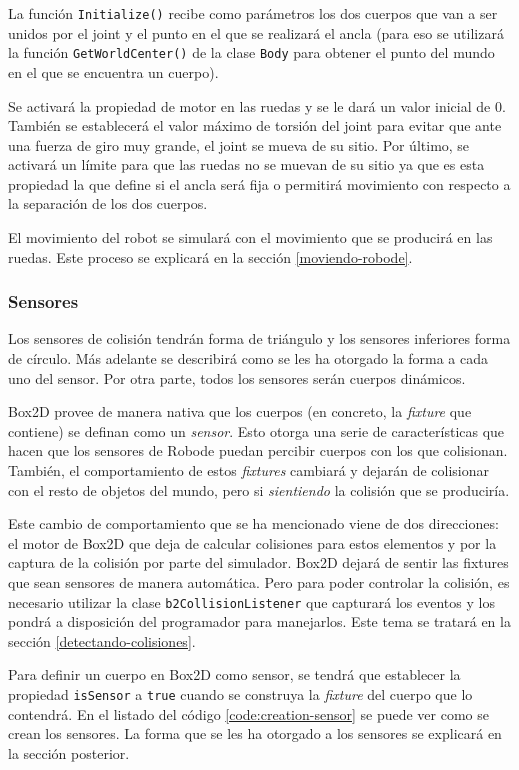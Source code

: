 La función \texttt{Initialize()} recibe como parámetros los dos cuerpos que van a ser unidos por el joint y el punto en el que se realizará el ancla (para eso se utilizará la función \texttt{GetWorldCenter()} de la clase \texttt{Body} para obtener el punto del mundo en el que se encuentra un cuerpo).

Se activará la propiedad de motor en las ruedas y se le dará un valor inicial de 0. También se establecerá el valor máximo de torsión del joint para evitar que ante una fuerza de giro muy grande, el joint se mueva de su sitio. Por último, se activará un límite para que las ruedas no se muevan de su sitio ya que es esta propiedad la que define si el ancla será fija o permitirá movimiento con respecto a la separación de los dos cuerpos.

El movimiento del robot se simulará con el movimiento que se producirá en las ruedas. Este proceso se explicará en la sección \ref{moviendo-robode}.

\subsubsection*{Sensores}

Los sensores de colisión tendrán forma de triángulo y los sensores inferiores forma de círculo. Más adelante se describirá como se les ha otorgado la forma a cada uno del sensor. Por otra parte, todos los sensores serán cuerpos dinámicos.

Box2D provee de manera nativa que los cuerpos (en concreto, la \emph{fixture} que contiene) se definan como un \emph{sensor}. Esto otorga una serie de características que hacen que los sensores de Robode puedan percibir cuerpos con los que colisionan. También, el comportamiento de estos \emph{fixtures} cambiará y dejarán de colisionar con el resto de objetos del mundo, pero si \emph{sientiendo} la colisión que se produciría.

Este cambio de comportamiento que se ha mencionado viene de dos direcciones: el motor de Box2D que deja de calcular colisiones para estos elementos y por la captura de la colisión por parte del simulador. Box2D dejará de sentir las fixtures que sean sensores de manera automática. Pero para poder controlar la colisión, es necesario utilizar la clase \texttt{b2CollisionListener} que capturará los eventos y los pondrá a disposición del programador para manejarlos. Este tema se tratará en la sección \ref{detectando-colisiones}.

Para definir un cuerpo en Box2D como sensor, se tendrá que establecer la propiedad \texttt{isSensor} a \texttt{true} cuando se construya la \emph{fixture} del cuerpo que lo contendrá. En el listado del código \ref{code:creation-sensor} se puede ver como se crean los sensores. La forma que se les ha otorgado a los sensores se explicará en la sección posterior.

